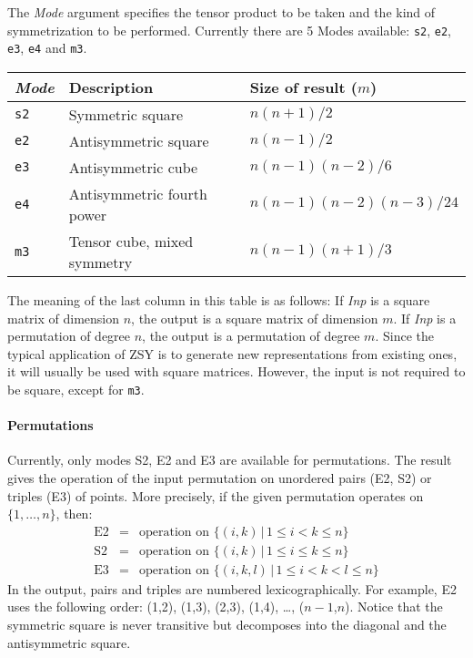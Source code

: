 The {\it Mode} argument specifies the tensor product to be taken
and the kind of symmetrization to be performed. Currently there are
5 Modes available: {\tt s2}, {\tt e2}, {\tt e3}, {\tt e4} and {\tt m3}.
\begin{center}
\begin{tabular}{|l|l|l|}
\hline
{\it Mode} & Description & Size of result ($m$) \\
\hline
{\tt s2} & Symmetric square & $n(n+1)/2$ \\
{\tt e2} & Antisymmetric square & $n(n-1)/2$ \\
{\tt e3} & Antisymmetric cube & $n(n-1)(n-2)/6$ \\
{\tt e4} & Antisymmetric fourth power & $n(n-1)(n-2)(n-3)/24$ \\
{\tt m3} & Tensor cube, mixed symmetry & $n(n-1)(n+1)/3$ \\
\hline
\end{tabular}
\end{center}
The meaning of the last column in this table is as follows:
If {\it Inp} is a square matrix of dimension $n$, the output is
a square matrix of dimension $m$. If {\it Inp} is a permutation of
degree $n$, the output is a permutation of degree $m$. Since the
typical application of ZSY is to generate new representations from 
existing ones, it will usually be used with square matrices. However,
the input is not required to be square, except for {\tt m3}.


\paragraph{Permutations}
Currently, only modes S2, E2 and E3 are available for permutations.
The result gives the operation of the input permutation on unordered
pairs (E2, S2) or triples (E3) of points. More precisely, if the given
permutation operates on $\{1,\ldots,n\}$, then:
\begin{eqnarray*}
\mbox{E2} & = & \mbox{operation on }\{(i,k)\,|\,1\leq i < k\leq n\} \\
\mbox{S2} & = & \mbox{operation on }\{(i,k)\,|\,1\leq i\leq k\leq n\}\\
\mbox{E3} & = & \mbox{operation on }\{(i,k,l)\,|\,1\leq i<k<l\leq n\}
\end{eqnarray*}
In the output, pairs and triples are numbered lexicographically.
For example, E2 uses the following order:
(1,2), (1,3), (2,3), (1,4), \ldots, ($n-1$,$n$).
Notice that the symmetric square is never transitive but 
decomposes into the diagonal and the antisymmetric square.

